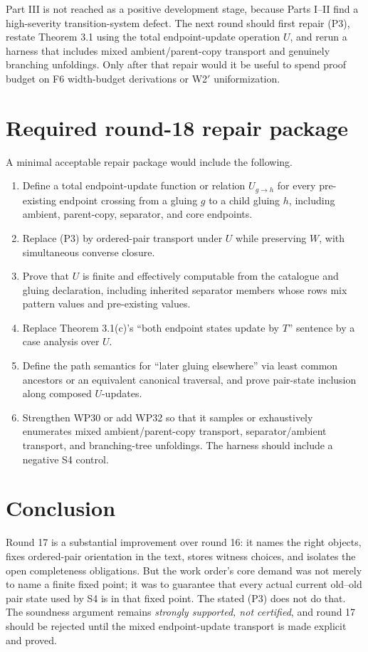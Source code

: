 \documentclass[11pt]{article}
\begin{document}
Part III is not reached as a positive development stage, because Parts I--II find a high-severity transition-system defect.  The next round should first repair (P3), restate Theorem 3.1 using the total endpoint-update operation $U$, and rerun a harness that includes mixed ambient/parent-copy transport and genuinely branching unfoldings.  Only after that repair would it be useful to spend proof budget on F6 width-budget derivations or W2$'$ uniformization.

\section{Required round-18 repair package}

A minimal acceptable repair package would include the following.
\begin{enumerate}[label=\textbf{M\arabic*.}]
  \item Define a total endpoint-update function or relation $U_{g\to h}$ for every pre-existing endpoint crossing from a gluing $g$ to a child gluing $h$, including ambient, parent-copy, separator, and core endpoints.
  \item Replace (P3) by ordered-pair transport under $U$ while preserving $W$, with simultaneous converse closure.
  \item Prove that $U$ is finite and effectively computable from the catalogue and gluing declaration, including inherited separator members whose rows mix pattern values and pre-existing values.
  \item Replace Theorem 3.1(c)'s ``both endpoint states update by $T$'' sentence by a case analysis over $U$.
  \item Define the path semantics for ``later gluing elsewhere'' via least common ancestors or an equivalent canonical traversal, and prove pair-state inclusion along composed $U$-updates.
  \item Strengthen WP30 or add WP32 so that it samples or exhaustively enumerates mixed ambient/parent-copy transport, separator/ambient transport, and branching-tree unfoldings.  The harness should include a negative S4 control.
\end{enumerate}

\section{Conclusion}

Round 17 is a substantial improvement over round 16: it names the right objects, fixes ordered-pair orientation in the text, stores witness choices, and isolates the open completeness obligations.  But the work order's core demand was not merely to name a finite fixed point; it was to guarantee that every actual current old--old pair state used by S4 is in that fixed point.  The stated (P3) does not do that.  The soundness argument remains \emph{strongly supported, not certified}, and round 17 should be rejected until the mixed endpoint-update transport is made explicit and proved.
\end{document}
